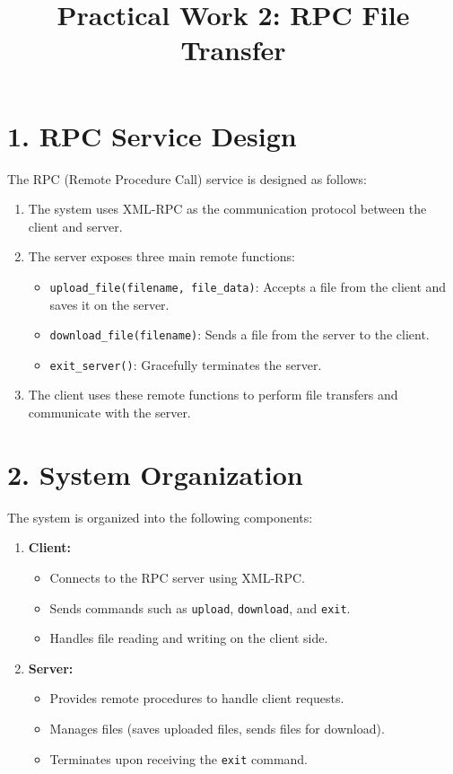 \documentclass[a4paper,12pt]{article}
\title{Practical Work 2: RPC File Transfer}
\author{}
\date{}
\begin{document}
\maketitle

\section*{1. RPC Service Design}
The RPC (Remote Procedure Call) service is designed as follows:
\begin{enumerate}
    \item The system uses XML-RPC as the communication protocol between the client and server.
    \item The server exposes three main remote functions:
    \begin{itemize}
        \item \texttt{upload\_file(filename, file\_data)}: Accepts a file from the client and saves it on the server.
        \item \texttt{download\_file(filename)}: Sends a file from the server to the client.
        \item \texttt{exit\_server()}: Gracefully terminates the server.
    \end{itemize}
    \item The client uses these remote functions to perform file transfers and communicate with the server.
\end{enumerate}


\section*{2. System Organization}
The system is organized into the following components:
\begin{enumerate}
    \item \textbf{Client:}
    \begin{itemize}
        \item Connects to the RPC server using XML-RPC.
        \item Sends commands such as \texttt{upload}, \texttt{download}, and \texttt{exit}.
        \item Handles file reading and writing on the client side.
    \end{itemize}
    \item \textbf{Server:}
    \begin{itemize}
        \item Provides remote procedures to handle client requests.
        \item Manages files (saves uploaded files, sends files for download).
        \item Terminates upon receiving the \texttt{exit} command.
    \end{itemize}
\end{enumerate}
\end{document}
